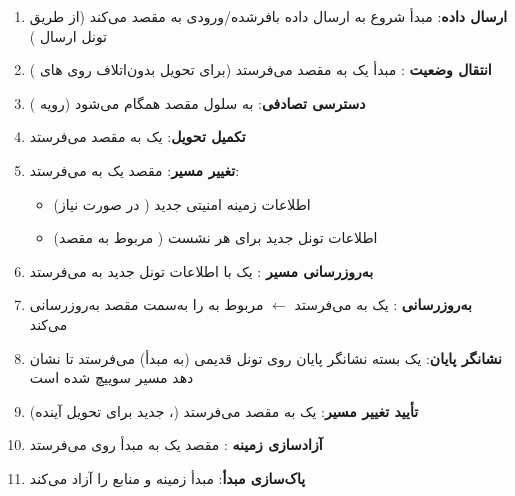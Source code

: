 \begin{enumerate}
  \begin{itemize}
  \tightlist
  \item
    شناسه سلول مقصد،  جدید
  \item
    پیکربندی الگوریتم امنیتی  مقصد
  \item
    پیکربندی منابع رادیویی برای سلول مقصد
  \end{itemize}
\item
  \textbf{ارسال داده}:  مبدأ شروع به ارسال داده  بافر‌شده/\allowbreak{}ورودی به  مقصد می‌کند (از طریق تونل ارسال )
\item
  \textbf{انتقال وضعیت }:  مبدأ یک  به  مقصد می‌فرستد (برای تحویل بدون‌اتلاف روی های )
\item
  \textbf{دسترسی تصادفی}:  به سلول مقصد همگام می‌شود (رویه )
\item
  \textbf{تکمیل تحویل}:  یک  به  مقصد می‌فرستد
\item
  \textbf{تغییر مسیر}:  مقصد یک  به  می‌فرستد:

  \begin{itemize}
  \tightlist
  \item
    اطلاعات زمینه امنیتی جدید ( در صورت نیاز)
  \item
    اطلاعات تونل  جدید برای هر نشست  ( مربوط به  مقصد)
  \end{itemize}
\item
  \textbf{به‌روزرسانی مسیر }:  یک  با اطلاعات تونل  جدید به  می‌فرستد
\item
  \textbf{به‌روزرسانی }:  یک  به  می‌فرستد \ensuremath{\leftarrow}  مربوط به  را به‌سمت  مقصد به‌روزرسانی می‌کند
\item
  \textbf{نشانگر پایان}:  یک بسته نشانگر پایان روی تونل  قدیمی (به  مبدأ) می‌فرستد تا نشان دهد مسیر  سوییچ شده است
\item
  \textbf{تأیید تغییر مسیر}:  یک  به  مقصد می‌فرستد (،  جدید برای تحویل آینده)
\item
  \textbf{آزادسازی زمینه }:  مقصد یک  به  مبدأ روی  می‌فرستد
\item
  \textbf{پاک‌سازی مبدأ}:  مبدأ زمینه و منابع  را آزاد می‌کند
\end{enumerate}


